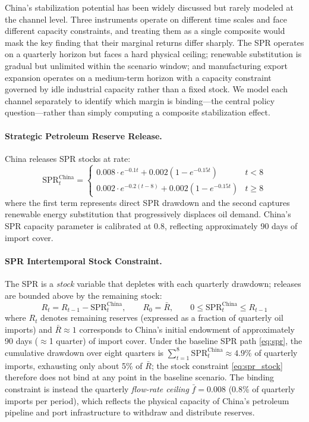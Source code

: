 \documentclass[12pt]{article}
\begin{document}
China's stabilization potential has been widely discussed but rarely modeled at the channel level. Three instruments operate on different time scales and face different capacity constraints, and treating them as a single composite would mask the key finding that their marginal returns differ sharply. The SPR operates on a quarterly horizon but faces a hard physical ceiling; renewable substitution is gradual but unlimited within the scenario window; and manufacturing export expansion operates on a medium-term horizon with a capacity constraint governed by idle industrial capacity rather than a fixed stock. We model each channel separately to identify which margin is binding---the central policy question---rather than simply computing a composite stabilization effect.

\paragraph{Strategic Petroleum Reserve Release.} China releases SPR stocks at rate:
\begin{equation}
\text{SPR}^{\text{China}}_t = \begin{cases} 0.008 \cdot e^{-0.1t} + 0.002(1-e^{-0.15t}) & t < 8 \\ 0.002 \cdot e^{-0.2(t-8)} + 0.002(1-e^{-0.15t}) & t \geq 8 \end{cases}
\label{eq:spr}
\end{equation}
where the first term represents direct SPR drawdown and the second captures renewable energy substitution that progressively displaces oil demand. China's SPR capacity parameter is calibrated at 0.8, reflecting approximately 90 days of import cover.

\paragraph{SPR Intertemporal Stock Constraint.} The SPR is a \emph{stock} variable that depletes with each quarterly drawdown; releases are bounded above by the remaining stock:
\begin{equation}
R_t = R_{t-1} - \text{SPR}^{\text{China}}_t, \qquad R_0 = \bar{R}, \qquad 0 \leq \text{SPR}^{\text{China}}_t \leq R_{t-1}
\label{eq:spr_stock}
\end{equation}
where $R_t$ denotes remaining reserves (expressed as a fraction of quarterly oil imports) and $\bar{R} \approx 1$ corresponds to China's initial endowment of approximately 90 days ($\approx$1 quarter) of import cover. Under the baseline SPR path \eqref{eq:spr}, the cumulative drawdown over eight quarters is $\sum_{t=1}^{8}\text{SPR}^{\text{China}}_t \approx 4.9\%$ of quarterly imports, exhausting only about 5\% of $\bar{R}$; the stock constraint \eqref{eq:spr_stock} therefore does not bind at any point in the baseline scenario. The binding constraint is instead the quarterly \emph{flow-rate ceiling} $\bar{f} = 0.008$ (0.8\% of quarterly imports per period), which reflects the physical capacity of China's petroleum pipeline and port infrastructure to withdraw and distribute reserves.
\end{document}
